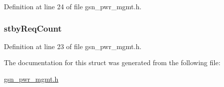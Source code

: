 Definition at line 24 of file gsn\_\-pwr\_\-mgmt.h.

\hypertarget{a00184_ab6d7cdcd26cd0bfb2c69f920c1ad0737}{
\subsubsection[{stbyReqCount}]{ {\bf stbyReqCount}}}
\label{a00184_ab6d7cdcd26cd0bfb2c69f920c1ad0737}


Definition at line 23 of file gsn\_\-pwr\_\-mgmt.h.



The documentation for this struct was generated from the following file:\begin{DoxyCompactItemize}
\item 
\hyperlink{a00541}{gsn\_\-pwr\_\-mgmt.h}\end{DoxyCompactItemize}
